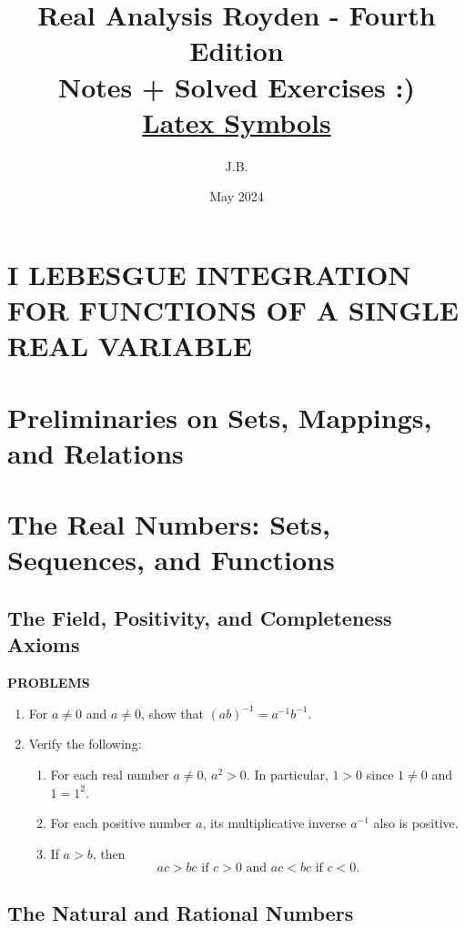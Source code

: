 \documentclass[a4paper,10pt]{book}
\title{Real Analysis Royden - Fourth Edition\\
	\large Notes + Solved Exercises :) \\
	\large \href{https://latex-programming.fandom.com/wiki/List_of_LaTeX_symbols}{Latex Symbols}
}
\author{J.B.}
\date{\small May 2024}
\theoremstyle{plain} %
\begin{document}
\maketitle
\tableofcontents

\setcounter{chapter}{0}
\chapter*{I LEBESGUE INTEGRATION FOR FUNCTIONS OF A SINGLE REAL VARIABLE}
\setcounter{chapter}{0}

\setcounter{chapter}{0}
\chapter*{Preliminaries on Sets, Mappings, and Relations}
\setcounter{chapter}{0}

\chapter{The Real Numbers: Sets, Sequences, and Functions}
\minitoc

\section{The Field, Positivity, and Completeness Axioms}
\begin{center}
	\textbf{PROBLEMS}
\end{center}
\begin{enumerate}
	\setcounter{enumi}{0}
	\item For $a\neq 0$ and $a\neq 0$, show that $(ab)^{-1} = a^{-1}b^{-1}$.
	\item Verify the following:
	\begin{enumerate}[label=(\roman*),align=left]
        \item For each real number $a\neq 0$, $a^2>0$. In particular, $1>0$ since $1 \neq 0$ and $1=1^2$.
        \item For each positive number $a$, its multiplicative inverse  $a^{-1}$ also is positive.
        \item If $a>b$, then \[ ac >bc \text{ if } c>0 \text{ and } ac < bc \text{ if } c<0. \]
    \end{enumerate}
\end{enumerate}

\section{The Natural and Rational Numbers}
\end{document}

